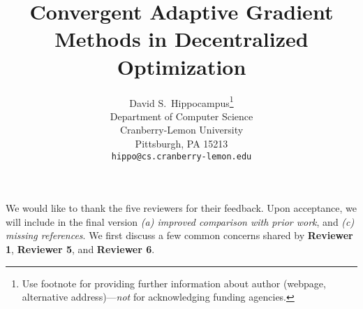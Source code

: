 \documentclass{article} %
\title{Convergent Adaptive Gradient Methods in Decentralized Optimization\vspace{-0.15in}}
\begin{document}
\maketitle


\author{%
  David S.~Hippocampus\thanks{Use footnote for providing further information
    about author (webpage, alternative address)---\emph{not} for acknowledging
    funding agencies.} \\
  Department of Computer Science\\
  Cranberry-Lemon University\\
  Pittsburgh, PA 15213 \\
  \texttt{hippo@cs.cranberry-lemon.edu} \\
}



We would like to thank the five reviewers for their feedback. Upon acceptance, we will include in the final version \emph{{\sf (a)} improved comparison with prior work}, and \emph{{\sf (c)} missing references}. 
We first discuss a few common concerns shared by \textbf{Reviewer 1},  \textbf{Reviewer 5}, and  \textbf{Reviewer 6}.
\end{document}
